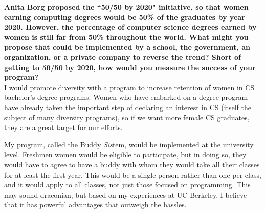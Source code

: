 \documentclass{article}
\begin{document}
	
\pagestyle{plain}

\textbf{Anita Borg proposed the ``50/50 by 2020" initiative, so that women earning computing degrees would be 50\% of the graduates by year 2020. However, the percentage of computer science degrees earned by women is still far from 50\% throughout the world.  What might you propose that could be implemented by a school, the government, an organization, or a private company to reverse the trend? Short of getting to 50/50 by 2020, how would you measure the success of your program?}\\

I would promote diversity with a program to increase retention of women in CS bachelor's degree programs.
Women who have embarked on a degree program have already taken the important step of declaring an interest in CS (itself the subject of many diversity programs), so if we want more female CS graduates, they are a great target for our efforts.

My program, called the Buddy \textit{Sis}tem, would be implemented at the university level.
Freshmen women would be eligible to participate, but in doing so, they would have to agree to have a buddy with whom they would take all their classes for at least the first year.
This would be a single person rather than one per class, and it would apply to all classes, not just those focused on programming.
This may sound draconian, but based on my experiences at UC Berkeley, I believe that it has powerful advantages that outweigh the hassles.
\end{document}
